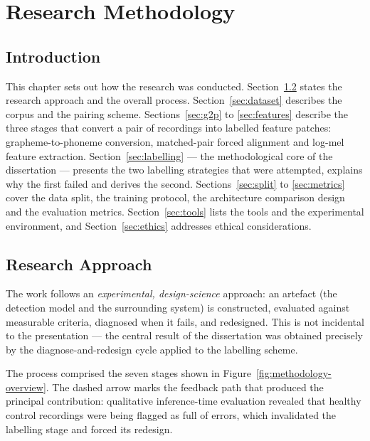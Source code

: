 \chapter{Research Methodology}
\label{ch:methodology}

\section{Introduction}

This chapter sets out how the research was conducted. Section~\ref{sec:approach}
states the research approach and the overall process. Section~\ref{sec:dataset}
describes the corpus and the pairing scheme. Sections~\ref{sec:g2p} to
\ref{sec:features} describe the three stages that convert a pair of recordings
into labelled feature patches: grapheme-to-phoneme conversion, matched-pair
forced alignment and log-mel feature extraction.
Section~\ref{sec:labelling} --- the methodological core of the dissertation ---
presents the two labelling strategies that were attempted, explains why the
first failed and derives the second. Sections~\ref{sec:split} to
\ref{sec:metrics} cover the data split, the training protocol, the architecture
comparison design and the evaluation metrics. Section~\ref{sec:tools} lists the
tools and the experimental environment, and Section~\ref{sec:ethics} addresses
ethical considerations.

\section{Research Approach}
\label{sec:approach}

The work follows an \emph{experimental, design-science} approach: an artefact
(the detection model and the surrounding system) is constructed, evaluated
against measurable criteria, diagnosed when it fails, and redesigned. This is
not incidental to the presentation --- the central result of the dissertation
was obtained precisely by the diagnose-and-redesign cycle applied to the
labelling scheme.

The process comprised the seven stages shown in
Figure~\ref{fig:methodology-overview}. The dashed arrow marks the feedback path
that produced the principal contribution: qualitative inference-time evaluation
revealed that healthy control recordings were being flagged as full of errors,
which invalidated the labelling stage and forced its redesign.


